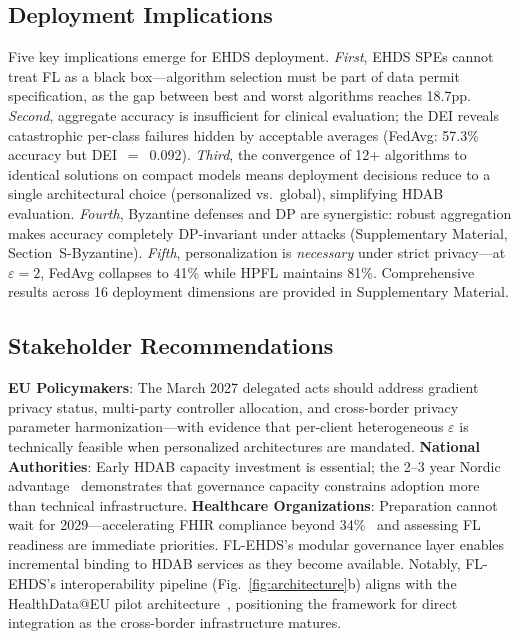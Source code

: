 \documentclass[conference,letterpaper]{IEEEtran}
\begin{document}
\subsection{Deployment Implications}

Five key implications emerge for EHDS deployment. \textit{First}, EHDS SPEs cannot treat FL as a black box---algorithm selection must be part of data permit specification, as the gap between best and worst algorithms reaches 18.7pp. \textit{Second}, aggregate accuracy is insufficient for clinical evaluation; the DEI reveals catastrophic per-class failures hidden by acceptable averages (FedAvg: 57.3\% accuracy but DEI~$=$~0.092). \textit{Third}, the convergence of 12+ algorithms to identical solutions on compact models means deployment decisions reduce to a single architectural choice (personalized vs.\ global), simplifying HDAB evaluation. \textit{Fourth}, Byzantine defenses and DP are synergistic: robust aggregation makes accuracy completely DP-invariant under attacks (Supplementary Material, Section~S-Byzantine). \textit{Fifth}, personalization is \textit{necessary} under strict privacy---at $\varepsilon{=}2$, FedAvg collapses to 41\% while HPFL maintains 81\%. Comprehensive results across 16 deployment dimensions are provided in Supplementary Material.

\subsection{Stakeholder Recommendations}

\textbf{EU Policymakers}: The March 2027 delegated acts should address gradient privacy status, multi-party controller allocation, and cross-border privacy parameter harmonization---with evidence that per-client heterogeneous $\varepsilon$ is technically feasible when personalized architectures are mandated. \textbf{National Authorities}: Early HDAB capacity investment is essential; the 2--3 year Nordic advantage~\cite{tehdas2024ready} demonstrates that governance capacity constrains adoption more than technical infrastructure. \textbf{Healthcare Organizations}: Preparation cannot wait for 2029---accelerating FHIR compliance beyond 34\%~\cite{hussein2025interop} and assessing FL readiness are immediate priorities. FL-EHDS's modular governance layer enables incremental binding to HDAB services as they become available. Notably, FL-EHDS's interoperability pipeline (Fig.~\ref{fig:architecture}b) aligns with the HealthData@EU pilot architecture~\cite{christiansen2025pilot}, positioning the framework for direct integration as the cross-border infrastructure matures.
\end{document}
